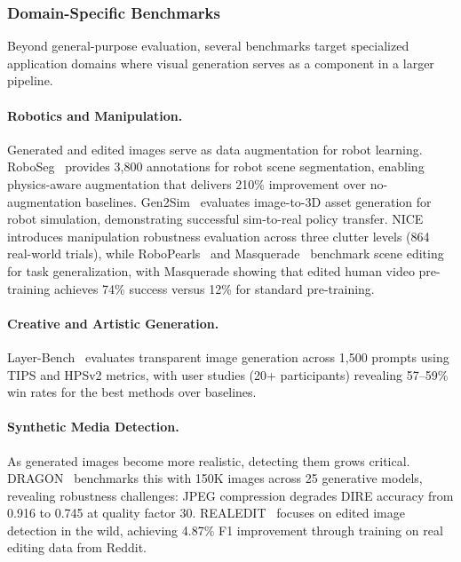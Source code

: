 \documentclass{llmxive}
\begin{document}
\subsubsection{Domain-Specific Benchmarks}

Beyond general-purpose evaluation, several benchmarks target specialized application domains where visual generation serves as a component in a larger pipeline.

\paragraph{Robotics and Manipulation.} Generated and edited images serve as data augmentation for robot learning. RoboSeg~\citep{RoboEngine} provides 3,800 annotations for robot scene segmentation, enabling physics-aware augmentation that delivers 210\% improvement over no-augmentation baselines. Gen2Sim~\citep{Gen2Sim} evaluates image-to-3D asset generation for robot simulation, demonstrating successful sim-to-real policy transfer. NICE~\citep{NICE} introduces manipulation robustness evaluation across three clutter levels (864 real-world trials), while RoboPearls~\citep{RoboPearls} and Masquerade~\citep{lepert2025masquerade} benchmark scene editing for task generalization, with Masquerade showing that edited human video pre-training achieves 74\% success versus 12\% for standard pre-training.

\paragraph{Creative and Artistic Generation.} Layer-Bench~\citep{ART_plus_multi-layer} evaluates transparent image generation across 1,500 prompts using TIPS and HPSv2 metrics, with user studies (20+ participants) revealing 57--59\% win rates for the best methods over baselines.

\paragraph{Synthetic Media Detection.} As generated images become more realistic, detecting them grows critical. DRAGON~\citep{DRAGON} benchmarks this with 150K images across 25 generative models, revealing robustness challenges: JPEG compression degrades DIRE accuracy from 0.916 to 0.745 at quality factor 30. REALEDIT~\citep{REALEDIT} focuses on edited image detection in the wild, achieving 4.87\% F1 improvement through training on real editing data from Reddit.
\end{document}
